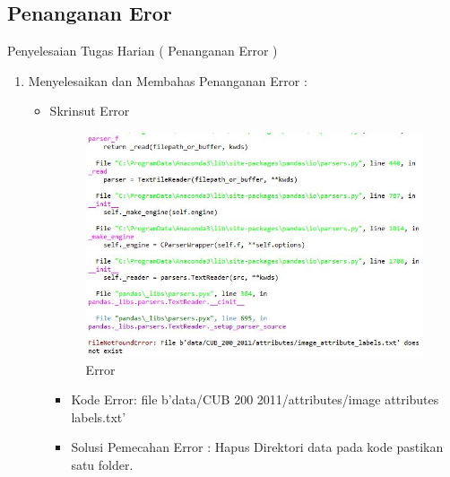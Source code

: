 \par
\par
\subsection{Penanganan Eror}
Penyelesaian Tugas Harian  ( Penanganan Error )
\begin{enumerate}
\item Menyelesaikan dan Membahas Penanganan Error :
\begin{itemize}
\item Skrinsut Error
\par
\begin{figure}[ht]

\centering
\includegraphics[scale=0.7]{figures/AFS/Error.jpg}
\caption{Error}
\label{contoh}
\end{figure}
\par
\begin{itemize}
\item Kode Error: file b'data/CUB 200 2011/attributes/image attributes labels.txt'
\par 
\item Solusi Pemecahan Error : Hapus Direktori data pada kode pastikan satu folder.
\par 
\par
\end{itemize}
\end{itemize}
\end{enumerate}


